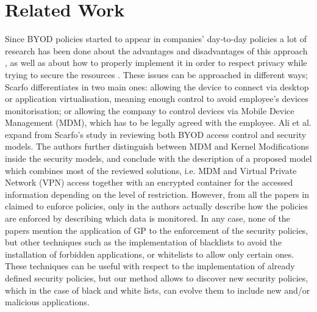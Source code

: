 \documentclass[runningheads]{llncs}
\begin{document}
\section{Related Work}
\label{sec:SotA}

Since BYOD policies started to appear in companies' day-to-day policies  a lot
of research has been done about the advantages and disadvantages of
this approach \cite{singh2012byod}, as well as about how to properly implement it in order to
respect privacy while trying to secure the resources \cite{scarfo2012new,ali2015analysis,de2015corporate}.
These issues can be approached in different ways; Scarfo
differentiates in \cite{scarfo2012new} two main ones: allowing the
device to connect via desktop or application virtualisation, meaning
enough control to avoid employee's devices monitorisation; or allowing
the company to control devices
via Mobile Device Management (MDM), which has to be legally agreed
with the employee. %
 Ali et al. expand from Scarfo's study in
\cite{ali2015analysis} reviewing both BYOD access control
 and security models. The authors further distinguish
between MDM and Kernel Modifications inside the security models, and
conclude with the description of a proposed model which combines most
of the reviewed solutions, i.e. MDM and Virtual Private Network (VPN)
access together with an encrypted container for the accessed
information depending on the level of restriction. However, from all
the papers in \cite{ali2015analysis} claimed to enforce policies, only
in \cite{rhee2013high} the authors actually describe how the policies
are enforced by describing which data is monitored. In any case, none
of the papers mention the application of GP to the enforcement of the
security policies, but other techniques such as the implementation of
blacklists to avoid the installation of forbidden applications, or
whitelists to allow only certain ones. These techniques can be useful
with respect to the implementation of already defined security
policies, but our method allows to discover new security policies,
which in the case of black and white lists, can evolve them to include
new and/or malicious applications. 
\end{document}
